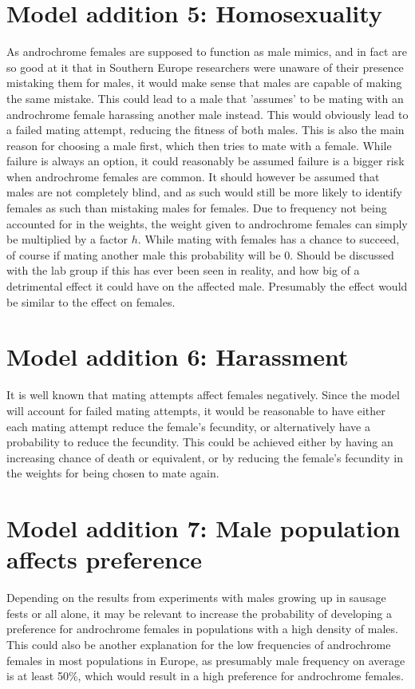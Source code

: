 \documentclass{article}
\begin{document}
\section{Model addition 5: Homosexuality}
As androchrome females are supposed to function as male mimics, and in fact are so good at it that in Southern Europe researchers were unaware of their presence mistaking them for males, it would make sense that males are capable of making the same mistake. This could lead to a male that 'assumes' to be mating with an androchrome female harassing another male instead. This would obviously lead to a failed mating attempt, reducing the fitness of both males. This is also the main reason for choosing a male first, which then tries to mate with a female. While failure is always an option, it could reasonably be assumed failure is a bigger risk when androchrome females are common. It should however be assumed that males are not completely blind, and as such would  still be more likely to identify females as such than mistaking males for females. Due to frequency not being accounted for in the weights, the weight given to androchrome females can simply be multiplied by a factor \(h\). While mating with females has a chance to succeed, of course if mating another male this probability will be 0. Should be discussed  with the lab group if this has ever been seen in reality, and how big of a detrimental effect it could have on the affected male. Presumably the effect would be similar to the effect on females.

\section{Model addition 6: Harassment}
It is well known that mating attempts affect females negatively. Since the model will account for failed mating attempts, it would be reasonable to have either each mating attempt reduce the female's fecundity, or alternatively have a probability to reduce the fecundity. This could be achieved either by having an increasing chance of death or equivalent, or by reducing the female's fecundity in the weights for being chosen to mate again.

\section{Model addition 7: Male population affects preference}
Depending on the results from experiments with males growing up in sausage fests or all alone, it may be relevant to increase the probability of developing a preference for androchrome females in populations with a high density of males. This could also be another explanation for the low frequencies of androchrome females in most populations in Europe, as presumably male frequency on average is at least 50\%, which would result in a high preference for androchrome females.

\printbibliography
\end{document}
